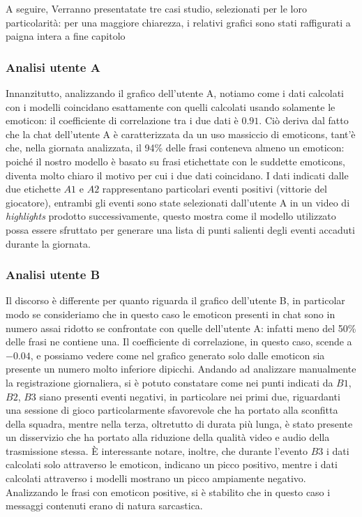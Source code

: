 \documentclass[a4paper,12pt,openright,twoside]{report}
\theoremstyle{definition}
\begin{document}
A seguire, Verranno presentatate tre casi studio, selezionati per le loro particolarità:
per una maggiore chiarezza, i relativi grafici sono stati raffigurati a paigna intera a fine
capitolo

\subsubsection{Analisi utente A}
Innanzitutto, analizzando il grafico dell'utente A, notiamo come i dati calcolati con i modelli coincidano esattamente
con quelli calcolati usando solamente le emoticon: il coefficiente di correlazione tra i due dati è $0.91$. 
Ciò deriva dal fatto che la chat dell'utente A è caratterizzata da
un uso massiccio di emoticons, tant'è che, nella giornata analizzata, il 94\% delle frasi conteneva almeno un emoticon:
poiché il nostro modello è basato su frasi etichettate con le suddette emoticons, diventa molto chiaro il motivo per cui i due dati coincidano.
I dati indicati dalle due etichette $A1$ e $A2$ rappresentano particolari eventi positivi (vittorie del giocatore),
entrambi gli eventi sono state selezionati dall'utente A in un video di \emph{highlights} prodotto successivamente,
questo mostra come il modello utilizzato possa essere sfruttato per generare una lista di punti salienti degli
eventi accaduti durante la giornata.

\subsubsection{Analisi utente B}
Il discorso è differente per quanto riguarda il grafico dell'utente B, in particolar
modo se consideriamo che in questo caso le emoticon presenti in chat
sono in numero assai ridotto se confrontate con quelle dell'utente A:
infatti meno del 50\%
delle frasi ne contiene una. Il coefficiente di correlazione, in questo caso, scende a $-0.04$, e possiamo vedere come
nel grafico generato solo dalle emoticon sia presente un numero molto inferiore dipicchi.
Andando ad analizzare manualmente la registrazione giornaliera, si è potuto constatare come nei punti indicati da
$B1$, $B2$, $B3$ siano presenti eventi negativi, in particolare nei primi due, riguardanti una sessione di gioco
particolarmente sfavorevole che ha portato alla sconfitta della squadra, mentre nella terza, oltretutto di durata
più lunga, è stato presente un disservizio che ha portato alla riduzione della qualità video e audio della 
trasmissione stessa.
\`E interessante notare, inoltre, che durante l'evento $B3$ i dati calcolati solo attraverso le emoticon, indicano
un picco positivo, mentre i dati calcolati attraverso i modelli mostrano un picco ampiamente negativo. Analizzando
le frasi con emoticon positive, si è stabilito che in questo caso i messaggi contenuti erano di natura sarcastica.
\end{document}
